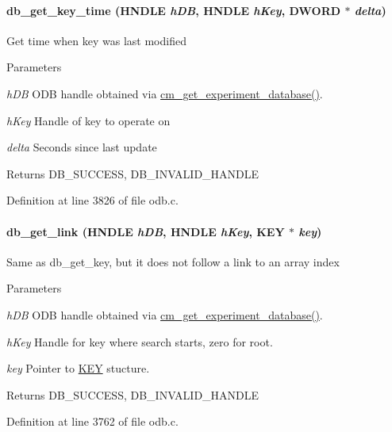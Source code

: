 \paragraph[{db\_\-get\_\-key\_\-time}]{ db\_\-get\_\-key\_\-time (HNDLE {\em hDB}, \/  HNDLE {\em hKey}, \/  {\bf DWORD} $\ast$ {\em delta})}\hfill\label{group__odbfunctionc_ga78b9946f84f5f8059dd71cc6dbccd1a7}
Get time when key was last modified 
\begin{DoxyParams}{Parameters}
\item[{\em hDB}]ODB handle obtained via \hyperlink{group__cmfunctionc_ga16b33b70783a3f5ba98b4094149d12b7}{cm\_\-get\_\-experiment\_\-database()}. \item[{\em hKey}]Handle of key to operate on \item[{\em delta}]Seconds since last update \end{DoxyParams}
\begin{DoxyReturn}{Returns}
DB\_\-SUCCESS, DB\_\-INVALID\_\-HANDLE 
\end{DoxyReturn}


Definition at line 3826 of file odb.c.
\paragraph[{db\_\-get\_\-link}]{ db\_\-get\_\-link (HNDLE {\em hDB}, \/  HNDLE {\em hKey}, \/  {\bf KEY} $\ast$ {\em key})}\hfill\label{group__odbfunctionc_ga331624e7c034494217249e36b97c8f69}
Same as db\_\-get\_\-key, but it does not follow a link to an array index 
\begin{DoxyParams}{Parameters}
\item[{\em hDB}]ODB handle obtained via \hyperlink{group__cmfunctionc_ga16b33b70783a3f5ba98b4094149d12b7}{cm\_\-get\_\-experiment\_\-database()}. \item[{\em hKey}]Handle for key where search starts, zero for root. \item[{\em key}]Pointer to \hyperlink{structKEY}{KEY} stucture. \end{DoxyParams}
\begin{DoxyReturn}{Returns}
DB\_\-SUCCESS, DB\_\-INVALID\_\-HANDLE 
\end{DoxyReturn}


Definition at line 3762 of file odb.c.

